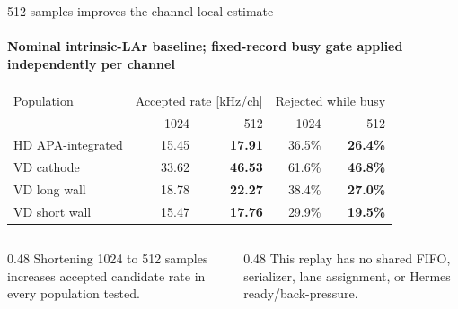 \documentclass[aspectratio=169,11pt]{beamer}
\begin{document}
\begin{frame}{512 samples improves the channel-local estimate}
  \framesubtitle{Nominal intrinsic-LAr baseline; fixed-record busy gate applied independently per channel}
  \small
  \setlength{\tabcolsep}{4pt}
  \renewcommand{\arraystretch}{1.19}
  \begin{tabular}{@{}lrrrr@{}}
    \toprule
    Population & \multicolumn{2}{c}{Accepted rate [kHz/ch]} & \multicolumn{2}{c}{Rejected while busy} \\
    & 1024 & 512 & 1024 & 512 \\
    \midrule
    HD APA-integrated & 15.45 & \textbf{17.91} & 36.5\% & \textbf{26.4\%} \\
    VD cathode & 33.62 & \textbf{46.53} & 61.6\% & \textbf{46.8\%} \\
    VD long wall & 18.78 & \textbf{22.27} & 38.4\% & \textbf{27.0\%} \\
    VD short wall & 15.47 & \textbf{17.76} & 29.9\% & \textbf{19.5\%} \\
    \bottomrule
  \end{tabular}

  \medskip
  \begin{columns}[T,onlytextwidth]
    \begin{column}{0.48\textwidth}
        {Shortening 1024 to 512 samples increases accepted candidate rate in every population tested.}
    \end{column}
    \begin{column}{0.48\textwidth}
        {This replay has no shared FIFO, serializer, lane assignment, or Hermes ready/back-pressure.}
    \end{column}
  \end{columns}
\end{frame}
\end{document}
